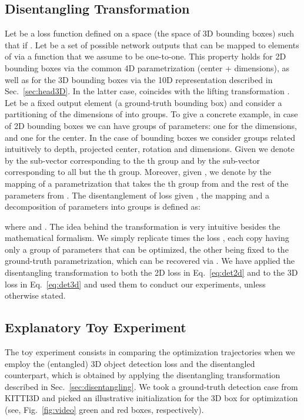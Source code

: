 \documentclass[10pt,twocolumn,letterpaper]{article}
\begin{document}
\subsection{Disentangling Transformation}
Let  be a loss function defined on a space  (\eg the space of 3D bounding boxes) such that  if .
Let  be a set of possible network outputs that can be mapped to elements of  via a function  that we assume to be one-to-one. 
This property holds for 2D bounding boxes via the common 4D parametrization (center + dimensions), as well as for the 3D bounding boxes via the 10D representation described in Sec.~\ref{sec:head3D}.
In the latter case,  coincides with the lifting transformation . 
Let  be a fixed output element (\eg a ground-truth bounding box) and consider a partitioning of the  dimensions of  into  groups. 
To give a concrete example, in case of 2D bounding boxes we can have  groups of parameters: one for the dimensions, and one for the center. In the case of  bounding boxes we consider  groups related intuitively to depth, projected center, rotation and dimensions. Given  we denote by  the sub-vector corresponding to the th group and by  the sub-vector corresponding to all but the th group. Moreover, given , we denote by  the mapping of a parametrization that takes the th group from  and the rest of the parameters from .
The disentanglement of loss  given , the mapping  and a decomposition of parameters into  groups is defined as:

where  and .
The idea behind the transformation is very intuitive besides the mathematical formalism. We simply replicate  times the loss , each copy having only a group of parameters that can be optimized, the other being fixed to the ground-truth parametrization, which can be recovered via .
We have applied the disentangling transformation to both the 2D loss in Eq.~\eqref{eq:det2d} and to the 3D loss in Eq.~\eqref{eq:det3d} and used them to conduct our experiments, unless otherwise stated. 


\subsection{Explanatory Toy Experiment}\label{sec:toy}
The toy experiment consists in comparing the optimization trajectories when we employ the (entangled) 3D object detection loss  and the disentangled counterpart, which is obtained by applying the disentangling transformation described in Sec.~\ref{sec:disentangling}. We took a ground-truth detection case from KITTI3D and picked an illustrative initialization for the 3D box for optimization (see, Fig.~\ref{fig:video} green and red boxes, respectively).
\end{document}
